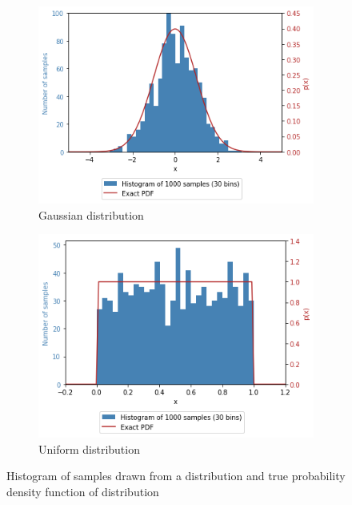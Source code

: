 \documentclass[a4paper]{article}
\begin{document}
\begin{figure}[h]
    \centering
    \begin{subfigure}[b]{0.45\textwidth}
        \centering
        \includegraphics[width=\textwidth]{figures/gaussian_histogram_and_pdf.png}
        \caption{Gaussian distribution}
        \label{fig:gaussian_histogram_and_pdf}
    \end{subfigure}
    \hfill
    \begin{subfigure}[b]{0.45\textwidth}
        \centering
        \includegraphics[width=\textwidth]{figures/uniform_histogram_and_pdf.png}
        \caption{Uniform distribution}
        \label{fig:uniform_histogram_and_pdf}
    \end{subfigure}
    \caption{Histogram of samples drawn from a distribution and true probability density function of distribution}
    \label{fig:histogram_and_pdf}
\end{figure}
\end{document}
